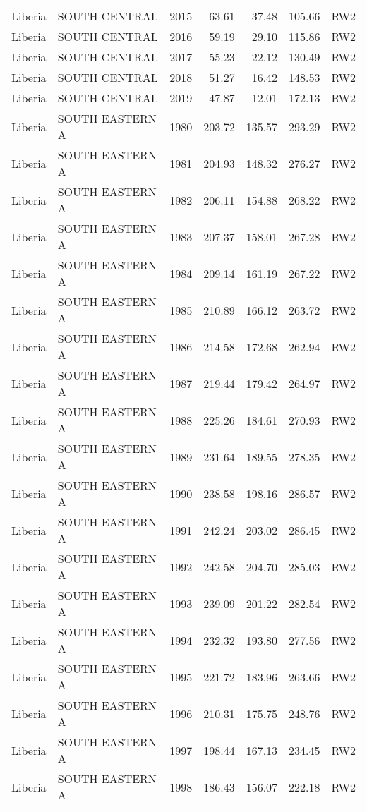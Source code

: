 \begin{longtable}{lllrrrl}
  Liberia & SOUTH CENTRAL & 2015 & 63.61 & 37.48 & 105.66 & RW2 \\ 
  Liberia & SOUTH CENTRAL & 2016 & 59.19 & 29.10 & 115.86 & RW2 \\ 
  Liberia & SOUTH CENTRAL & 2017 & 55.23 & 22.12 & 130.49 & RW2 \\ 
  Liberia & SOUTH CENTRAL & 2018 & 51.27 & 16.42 & 148.53 & RW2 \\ 
  Liberia & SOUTH CENTRAL & 2019 & 47.87 & 12.01 & 172.13 & RW2 \\ 
  Liberia & SOUTH EASTERN A & 1980 & 203.72 & 135.57 & 293.29 & RW2 \\ 
  Liberia & SOUTH EASTERN A & 1981 & 204.93 & 148.32 & 276.27 & RW2 \\ 
  Liberia & SOUTH EASTERN A & 1982 & 206.11 & 154.88 & 268.22 & RW2 \\ 
  Liberia & SOUTH EASTERN A & 1983 & 207.37 & 158.01 & 267.28 & RW2 \\ 
  Liberia & SOUTH EASTERN A & 1984 & 209.14 & 161.19 & 267.22 & RW2 \\ 
  Liberia & SOUTH EASTERN A & 1985 & 210.89 & 166.12 & 263.72 & RW2 \\ 
  Liberia & SOUTH EASTERN A & 1986 & 214.58 & 172.68 & 262.94 & RW2 \\ 
  Liberia & SOUTH EASTERN A & 1987 & 219.44 & 179.42 & 264.97 & RW2 \\ 
  Liberia & SOUTH EASTERN A & 1988 & 225.26 & 184.61 & 270.93 & RW2 \\ 
  Liberia & SOUTH EASTERN A & 1989 & 231.64 & 189.55 & 278.35 & RW2 \\ 
  Liberia & SOUTH EASTERN A & 1990 & 238.58 & 198.16 & 286.57 & RW2 \\ 
  Liberia & SOUTH EASTERN A & 1991 & 242.24 & 203.02 & 286.45 & RW2 \\ 
  Liberia & SOUTH EASTERN A & 1992 & 242.58 & 204.70 & 285.03 & RW2 \\ 
  Liberia & SOUTH EASTERN A & 1993 & 239.09 & 201.22 & 282.54 & RW2 \\ 
  Liberia & SOUTH EASTERN A & 1994 & 232.32 & 193.80 & 277.56 & RW2 \\ 
  Liberia & SOUTH EASTERN A & 1995 & 221.72 & 183.96 & 263.66 & RW2 \\ 
  Liberia & SOUTH EASTERN A & 1996 & 210.31 & 175.75 & 248.76 & RW2 \\ 
  Liberia & SOUTH EASTERN A & 1997 & 198.44 & 167.13 & 234.45 & RW2 \\ 
  Liberia & SOUTH EASTERN A & 1998 & 186.43 & 156.07 & 222.18 & RW2 \\ 

\end{longtable}

